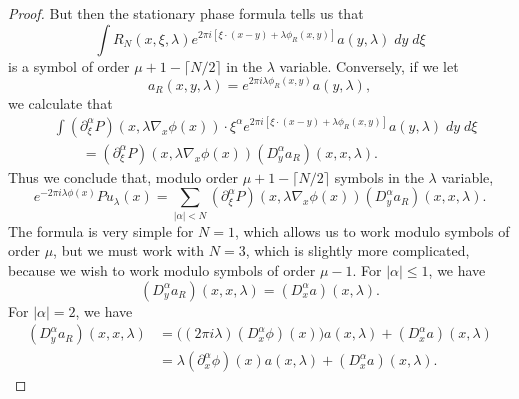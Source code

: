 \documentclass{article}
\theoremstyle{plain}
\theoremstyle{remark}
\theoremstyle{definition}
\begin{document}
\begin{proof}
	But then the stationary phase formula tells us that
	\[ \int R_N(x,\xi,\lambda) e^{2 \pi i [ \xi \cdot (x - y) + \lambda \phi_R(x,y) ]} a(y,\lambda)\; dy\; d\xi \]
	is a symbol of order $\mu + 1 - \lceil N/2 \rceil$ in the $\lambda$ variable. Conversely, if we let
	\[ a_R(x,y,\lambda) = e^{2 \pi i \lambda \phi_R(x,y)} a(y,\lambda), \]
	we calculate that
	\begin{align*}
		&\int (\partial_\xi^\alpha P)(x, \lambda \nabla_x \phi(x)) \cdot \xi^\alpha e^{2 \pi i [\xi \cdot (x - y) + \lambda \phi_R(x,y)]} a(y,\lambda)\; dy\; d\xi\\
		&\quad\quad = (\partial_\xi^\alpha P)(x, \lambda \nabla_x \phi(x)) (D_y^\alpha a_R)(x,x,\lambda).
	\end{align*}
	Thus we conclude that, modulo order $\mu + 1 - \lceil N/2 \rceil$ symbols in the $\lambda$ variable,
	\[ e^{-2 \pi i \lambda \phi(x)} Pu_\lambda(x) = \sum_{|\alpha| < N} (\partial_\xi^\alpha P)(x, \lambda \nabla_x \phi(x)) (D^\alpha_y a_R)(x,x,\lambda). \]
	The formula is very simple for $N = 1$, which allows us to work modulo symbols of order $\mu$, but we must work with $N = 3$, which is slightly more complicated, because we wish to work modulo symbols of order $\mu - 1$. For $|\alpha| \leq 1$, we have
	\[ (D^\alpha_y a_R)(x,x,\lambda) = (D^\alpha_x a)(x,\lambda). \]
	For $|\alpha| = 2$, we have
	\begin{align*}
		(D^\alpha_y a_R)(x,x,\lambda) &= \Big( (2 \pi i \lambda) (D^\alpha_x \phi)(x) \Big) a(x,\lambda) + (D^\alpha_x a)(x,\lambda)\\
		&= \lambda (\partial^\alpha_x \phi)(x) a(x,\lambda) + (D^\alpha_x a)(x,\lambda).
	\end{align*}

\end{proof}
\end{document}
